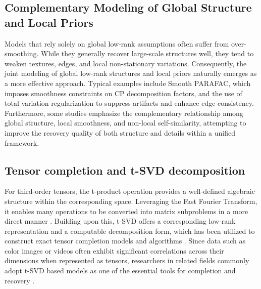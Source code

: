 \documentclass[a4paper,12pt]{article}
\numberwithin{equation}{section}
\numberwithin{algorithm}{section}
\theoremstyle{remark}
\theoremstyle{definition}
\begin{document}
\subsection{Complementary Modeling of Global Structure and Local Priors}

Models that rely solely on global low-rank assumptions often suffer from over-smoothing. While they generally recover large-scale structures well, they tend to weaken textures, edges, and local non-stationary variations. Consequently, the joint modeling of global low-rank structures and local priors naturally emerges as a more effective approach. Typical examples include Smooth PARAFAC\cite{yokota2016smooth}, which imposes smoothness constraints on CP decomposition factors, and the use of total variation regularization to suppress artifacts and enhance edge consistency\cite{rudin1992rof,li2017tv}. Furthermore, some studies emphasize the complementary relationship among global structure, local smoothness, and non-local self-similarity, attempting to improve the recovery quality of both structure and details within a unified framework\cite{zhao2021complementary,yuan2019tensor}.





\subsection{Tensor completion and  t-SVD decomposition}
For third-order tensors, the  t-product operation provides a well-defined algebraic structure within the corresponding space. Leveraging the Fast Fourier Transform, it enables many operations to be converted into matrix subproblems in a more direct manner \cite{kilmer2011factorization,kilmer2013operators}. Building upon this,  t-SVD offers a corresponding low-rank representation and a computable decomposition form, which has been utilized to construct exact tensor completion models and algorithms \cite{zhang2017tsvd}. Since data such as color images or videos often exhibit significant correlations across their dimensions when represented as tensors, researchers in related fields commonly adopt  t-SVD based models as one of the essential tools for completion and recovery \cite{panagakis2021tensorcvdl}.
\end{document}
